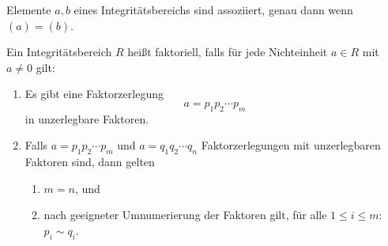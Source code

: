 \documentclass{book}
\begin{document}
\begin{rem}
    \label{rem:ass}
    Elemente $a,b$ eines Integritätsbereichs sind assoziiert, genau dann wenn
    $(a) = (b)$. 
\end{rem}

\begin{defi}
    \label{defi:faktoriell}
    Ein Integritätsbereich $R$ heißt faktoriell, falls für jede Nichteinheit $a \in R$ mit $a \ne 0$ gilt:
    \begin{enumerate}
        \item Es gibt eine Faktorzerlegung
           \begin{equation}
               \label{eq:faktor}
                a = p_1 p_2 \cdots p_m
           \end{equation}
            in unzerlegbare Faktoren.
        \item Falls $a = p_1 p_2 \cdots p_m$ und $a = q_1 q_2 \cdots q_n$
            Faktorzerlegungen mit unzerlegbaren Faktoren sind, dann gelten
            \begin{enumerate}[label=\arabic*.]
                \item $m = n$, und
                \item nach geeigneter Umnumerierung der Faktoren gilt, für alle
                    $1 \le i \le m$: $p_i \sim q_i$.
            \end{enumerate} 
    \end{enumerate}
\end{defi}
\end{document}

